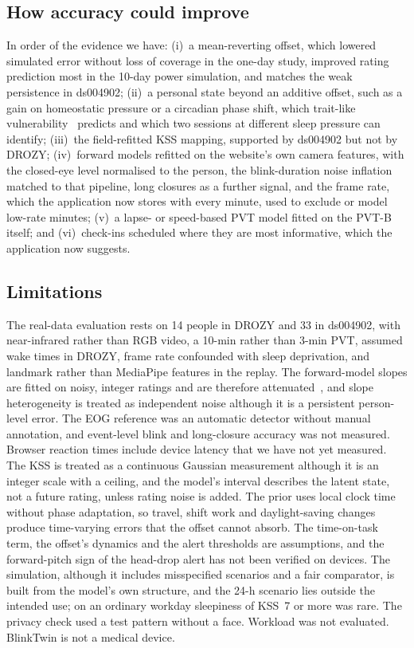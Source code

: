 \subsection{How accuracy could improve}
In order of the evidence we have: (i)~a mean-reverting offset, which lowered simulated error without loss of coverage in the one-day study, improved rating prediction most in the 10-day power simulation, and matches the weak persistence in ds004902; (ii)~a personal state beyond an additive offset, such as a gain on homeostatic pressure or a circadian phase shift, which trait-like vulnerability~\cite{vandongen2004systematic} predicts and which two sessions at different sleep pressure can identify; (iii)~the field-refitted KSS mapping, supported by ds004902 but not by DROZY; (iv)~forward models refitted on the website's own camera features, with the closed-eye level normalised to the person, the blink-duration noise inflation matched to that pipeline, long closures as a further signal, and the frame rate, which the application now stores with every minute, used to exclude or model low-rate minutes; (v)~a lapse- or speed-based PVT model fitted on the PVT-B itself; and (vi)~check-ins scheduled where they are most informative, which the application now suggests.

\subsection{Limitations}
The real-data evaluation rests on 14 people in DROZY and 33 in ds004902, with near-infrared rather than RGB video, a 10-min rather than 3-min PVT, assumed wake times in DROZY, frame rate confounded with sleep deprivation, and landmark rather than MediaPipe features in the replay. The forward-model slopes are fitted on noisy, integer ratings and are therefore attenuated~\cite{carroll2006measurement}, and slope heterogeneity is treated as independent noise although it is a persistent person-level error. The EOG reference was an automatic detector without manual annotation, and event-level blink and long-closure accuracy was not measured. Browser reaction times include device latency that we have not yet measured. The KSS is treated as a continuous Gaussian measurement although it is an integer scale with a ceiling, and the model's interval describes the latent state, not a future rating, unless rating noise is added. The prior uses local clock time without phase adaptation, so travel, shift work and daylight-saving changes produce time-varying errors that the offset cannot absorb. The time-on-task term, the offset's dynamics and the alert thresholds are assumptions, and the forward-pitch sign of the head-drop alert has not been verified on devices. The simulation, although it includes misspecified scenarios and a fair comparator, is built from the model's own structure, and the 24-h scenario lies outside the intended use; on an ordinary workday sleepiness of KSS~7 or more was rare. The privacy check used a test pattern without a face. Workload was not evaluated. BlinkTwin is not a medical device.

